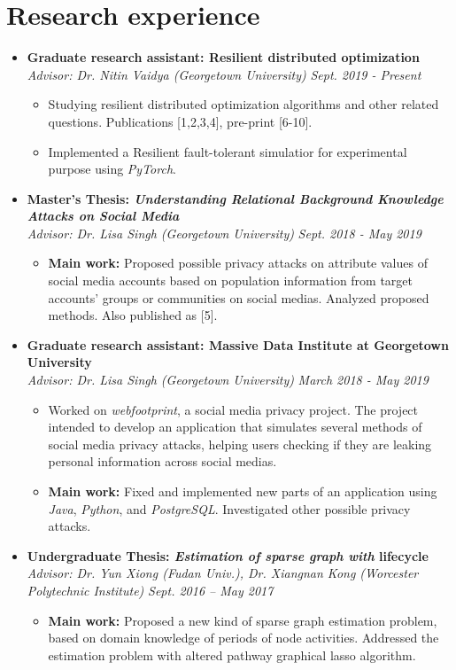 \documentclass[letterpaper,11pt]{article}
\makeatletter
\newcommand{\resumeItem}[2]{
  \vspace{-3pt}
  \item{
    \textbf{#1}{#2}
  }
}
\newcommand{\resumeSubheading}[4]{
  \vspace{-7pt}\item
      \textbf{#1} \hfill #2 \\
      \textit{\small#3} \hfill \textit{\small #4}
  \vspace{-4pt}
}
\newcommand{\resumeSubHeadingListStart}{\begin{itemize}[leftmargin=*]}
\newcommand{\resumeSubHeadingListEnd}{\end{itemize}}
\newcommand{\resumeItemListStart}{\begin{itemize}}
\newcommand{\resumeItemListEnd}{\end{itemize}\vspace{-5pt}}
\makeatother
\begin{document}
\section{Research experience}
  \resumeSubHeadingListStart
    \resumeSubheading
      {Graduate research assistant: Resilient distributed optimization}{}
      {\emph{Advisor: Dr. Nitin Vaidya (Georgetown University)}}{Sept. 2019 - Present}
      \resumeItemListStart
        \resumeItem{}
          {Studying resilient distributed optimization algorithms and other related questions. Publications [1,2,3,4], pre-print [6-10].}
        \resumeItem{}
          {Implemented a Resilient fault-tolerant simulatior for experimental purpose using \textit{PyTorch}.}
      \resumeItemListEnd

    \resumeSubheading
      {Master's Thesis: \emph{Understanding Relational Background Knowledge Attacks on Social Media}}{}
      {\emph{Advisor: Dr. Lisa Singh (Georgetown University)}}{Sept. 2018 - May 2019}
      \resumeItemListStart
        \resumeItem{Main work: }
          {Proposed possible privacy attacks on attribute values of social media accounts based on population information from target accounts' groups or communities on social medias. Analyzed proposed methods. Also published as [5].}
      \resumeItemListEnd

    \resumeSubheading
      {Graduate research assistant: Massive Data Institute at Georgetown University}{}
      {\emph{Advisor: Dr. Lisa Singh (Georgetown University)}}{March 2018 - May 2019}
      \resumeItemListStart
        \resumeItem{}
          {Worked on \emph{webfootprint}, a social media privacy project. The project intended to develop an application that simulates several methods of social media privacy attacks, helping users checking if they are leaking personal information across social medias.}
        \resumeItem{Main work: }
          {Fixed and implemented new parts of an application using \textit{Java}, \textit{Python}, and \textit{PostgreSQL}. Investigated other possible privacy attacks.}
      \resumeItemListEnd

    \resumeSubheading
      {Undergraduate Thesis: \emph{Estimation of sparse graph with} lifecycle}{}
      {\emph{Advisor: Dr. Yun Xiong (Fudan Univ.), Dr. Xiangnan Kong (Worcester Polytechnic Institute)}}{Sept. 2016 -- May 2017}
      \resumeItemListStart
        \resumeItem{Main work: }
          {Proposed a new kind of sparse graph estimation problem, based on domain knowledge of periods of node activities. Addressed the estimation problem with altered pathway graphical lasso algorithm.}
      \resumeItemListEnd
  \resumeSubHeadingListEnd
\end{document}
